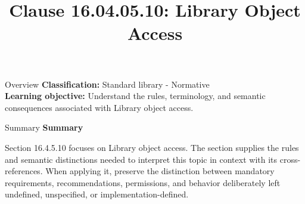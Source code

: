 \documentclass[10pt,letterpaper]{article}
\title{Clause 16.04.05.10: Library Object Access}
\author{}
\date{}
\begin{document}
\maketitle
\begin{CornellOverviewBox}{Overview}
\textbf{Classification:} Standard library - Normative\\[2pt]
\textbf{Learning objective:} Understand the rules, terminology, and semantic consequences associated with Library object access.
\end{CornellOverviewBox}\begin{CornellSummaryBox}{Summary}
{\sffamily\bfseries\color{Accent} Summary}\par\vspace{3pt}Section 16.4.5.10 focuses on Library object access. The section supplies the rules and semantic distinctions needed to interpret this topic in context with its cross-references. When applying it, preserve the distinction between mandatory requirements, recommendations, permissions, and behavior deliberately left undefined, unspecified, or implementation-defined.
\end{CornellSummaryBox}
\end{document}
